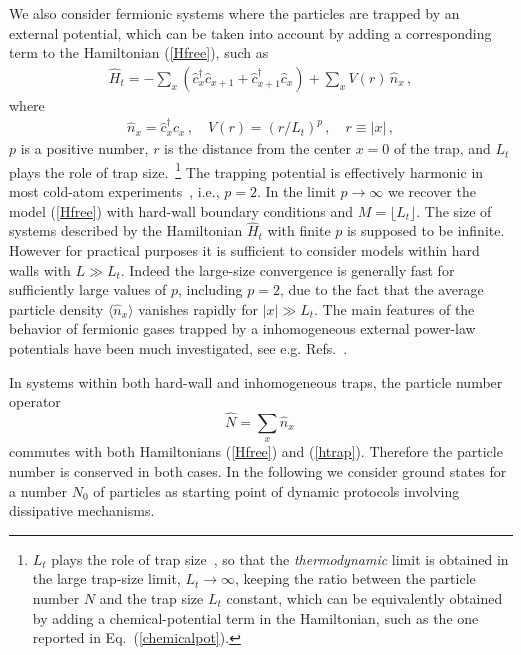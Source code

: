   We also consider fermionic systems where the particles are trapped by
  an external potential, which can be taken into account by adding a
  corresponding term to the Hamiltonian (\ref{Hfree}), such as
  \begin{eqnarray}
    \hat H_t =
    - \sum _x 
    (\hat c_{x}^\dagger \hat c_{x+1} +  \hat c_{x+1}^\dagger \hat c_{x})
  +  \sum_x V(r) \, \hat n_x\,,\label{htrap}
    \end{eqnarray}
  where 
  \begin{eqnarray}
  \hat n_x =
  \hat c_x^\dagger c_x\,,\quad  V(r)= (r/L_t)^p\,, \quad r\equiv |x|\,,
     \label{potential}
  \end{eqnarray}
  $p$ is a positive number, $r$ is the distance from the center $x=0$ of
  the trap, and $L_t$ plays the role of trap size.~\footnote{$L_t$ plays
  the role of trap size~\cite{BDZ-08,RM-04,CV-10-2}, so that the {\em
    thermodynamic} limit is obtained in the large trap-size limit,
  $L_t\to \infty$, keeping the ratio between the particle number $N$ and
  the trap size $L_t$ constant, which can be equivalently obtained by
  adding a chemical-potential term in the Hamiltonian, such as the one
  reported in Eq.~(\ref{chemicalpot}).}  The trapping potential is
  effectively harmonic in most cold-atom experiments~\cite{BDZ-08},
  i.e., $p=2$.  In the limit $p\to\infty$ we recover the model
  (\ref{Hfree}) with hard-wall boundary conditions and $M=\lfloor L_t
  \rfloor$.  The size of systems described by the Hamiltonian $\hat H_t$
  with finite $p$ is supposed to be infinite. However for practical
  purposes it is sufficient to consider models within hard walls with $L
  \gg L_t$. Indeed the large-size convergence is generally fast for
  sufficiently large values of $p$, including $p=2$, due to the fact
  that the average particle density $\langle \hat{n}_x \rangle$ vanishes
  rapidly for $|x|\gg L_t$. The main features of the behavior of fermionic
  gases trapped by a inhomogeneous external power-law potentials have
  been much investigated, see e.g.
  Refs.~\cite{ACV-14,Nigro-17,CV-10,CV-10-2,CV-10-3,CV-10-4,Pollet-12,V-12,CLM-15}.
  
  In systems within both hard-wall and inhomogeneous traps, the particle
  number operator
  \begin{equation}
    \hat{N} = \sum_x \hat n_{x}\,
  \label{partnum}
    \end{equation}
  commutes with both Hamiltonians (\ref{Hfree}) and
  (\ref{htrap}). Therefore the particle number is conserved in both
  cases.  In the following we consider ground states for a number $N_0$
  of particles as starting point of dynamic protocols involving
  dissipative mechanisms.
  
